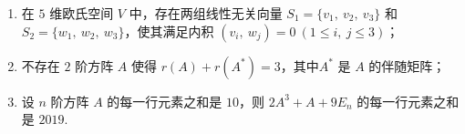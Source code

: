 \begin{enumerate}
\begin{enumerate}[label=(\arabic*)]
        \item 在 $5$ 维欧氏空间 $V$ 中，存在两组线性无关向量 $S_1=\{v_1,\ v_2,\ v_3\}$ 和 $S_2=\{w_1,\ w_2,\ w_3\}$，使其满足内积 $(v_i,\ w_j)=0\ (1 \leq i,\ j \leq 3)$；
        \item 不存在 $2$ 阶方阵 $A$ 使得 $r(A)+r(A^*)=3$，其中$A^*$ 是 $A$ 的伴随矩阵；
        \item 设 $n$ 阶方阵 $A$ 的每一行元素之和是 $10$，则 $2A^3+A+9E_n$ 的每一行元素之和是 $2019$.
    \end{enumerate}
\end{enumerate}

\newpage

